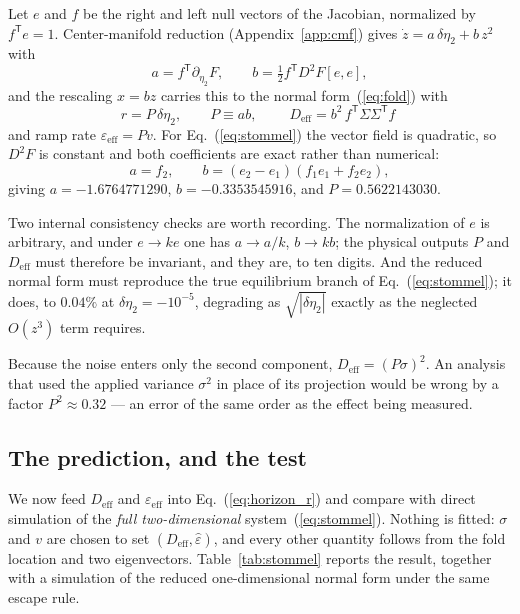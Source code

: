 \documentclass[%
 aip,
 cha,
 amsmath,amssymb,
 reprint,
 superscriptaddress,
 floatfix,
]{revtex4-2}
\newcommand{\Sig}{\hat\varepsilon}
\begin{document}
Let $e$ and $f$ be the right and left null vectors of the Jacobian, normalized by $f^{\mathsf T}e=1$.  Center-manifold reduction (Appendix~\ref{app:cmf}) gives $\dot z=a\,\delta\eta_2+b\,z^2$ with
\begin{equation}
\label{eq:ab}
a=f^{\mathsf T}\partial_{\eta_2}F,\qquad b=\tfrac12 f^{\mathsf T}D^2F[e,e],
\end{equation}
and the rescaling $x=bz$ carries this to the normal form~(\ref{eq:fold}) with
\begin{equation}
\label{eq:reduction}
r=P\,\delta\eta_2,\qquad P\equiv ab,\qquad
\boxed{\;D_{\mathrm{eff}}=b^2\,f^{\mathsf T}\Sigma\Sigma^{\mathsf T}f\;}
\end{equation}
and ramp rate $\varepsilon_{\mathrm{eff}}=Pv$.  For Eq.~(\ref{eq:stommel}) the vector field is quadratic, so $D^2F$ is constant and both coefficients are exact rather than numerical:
\begin{equation}
a=f_2,\qquad b=(e_2-e_1)(f_1e_1+f_2e_2),
\end{equation}
giving $a=-1.6764771290$, $b=-0.3353545916$, and $P=0.5622143030$.

Two internal consistency checks are worth recording.  The normalization of $e$ is arbitrary, and under $e\to ke$ one has $a\to a/k$, $b\to kb$; the physical outputs $P$ and $D_{\mathrm{eff}}$ must therefore be invariant, and they are, to ten digits.  And the reduced normal form must reproduce the true equilibrium branch of Eq.~(\ref{eq:stommel}); it does, to $0.04\%$ at $\delta\eta_2=-10^{-5}$, degrading as $\sqrt{|\delta\eta_2|}$ exactly as the neglected $O(z^3)$ term requires.

Because the noise enters only the second component, $D_{\mathrm{eff}}=(P\sigma)^2$.  An analysis that used the applied variance $\sigma^2$ in place of its projection would be wrong by a factor $P^2\approx0.32$ --- an error of the same order as the effect being measured.

\subsection{The prediction, and the test}

We now feed $D_{\mathrm{eff}}$ and $\varepsilon_{\mathrm{eff}}$ into Eq.~(\ref{eq:horizon_r}) and compare with direct simulation of the \emph{full two-dimensional} system~(\ref{eq:stommel}).  Nothing is fitted: $\sigma$ and $v$ are chosen to set $(D_{\mathrm{eff}},\Sig)$, and every other quantity follows from the fold location and two eigenvectors.  Table~\ref{tab:stommel} reports the result, together with a simulation of the reduced one-dimensional normal form under the same escape rule.
\end{document}
